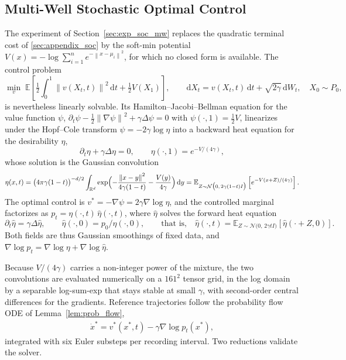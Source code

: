 \documentclass[preprint]{elsarticle}
\newcommand{\rd}{\mathrm{d}}
\newcommand{\dd}{\,\mathrm{d}}          %
\newcommand{\qb}[1]{\bigl(#1\bigr)}          %
\newcommand{\qB}[1]{\Bigl(#1\Bigr)}          %
\newcommand{\norm}[1]{\left\|#1\right\|}
\newcommand{\R}{\mathbb{R}}
\newcommand{\E}{\mathbb{E}}
\newcommand{\g}{\gamma}
\newcommand{\m}{\mu}
\newcommand{\sN}{\mathcal{N}}
\begin{document}
\subsection{Multi-Well Stochastic Optimal Control}\label{sec:appendix_soc_mw}

The experiment of Section~\ref{sec:exp_soc_mw} replaces the quadratic terminal cost of \ref{sec:appendix_soc} by the soft-min potential \(V(x)=-\log\sum_{i=1}^{n}e^{-\norm{x-\m_i}^2}\), for which no closed form is available. The control problem
\[
\min_v\;
\E\left[\tfrac12\int_0^1\norm{v(X_t,t)}^2\dd t+\tfrac12 V(X_1)\right],
\qquad
\rd X_t=v(X_t,t)\,\rd t+\sqrt{2\g}\,\rd W_t,
\quad X_0\sim P_0,
\]
is nevertheless linearly solvable. Its Hamilton--Jacobi--Bellman equation for the value function $\psi$, $\partial_t\psi-\tfrac12\norm{\nabla\psi}^2+\g\Delta\psi=0$ with $\psi(\cdot,1)=\tfrac12 V$, linearizes under the Hopf--Cole transform $\psi=-2\g\log\eta$ \cite{fleming2006controlled,kappen2005linear} into a backward heat equation for
the desirability $\eta$,
\[
\partial_t\eta+\g\Delta\eta=0,
\qquad
\eta(\cdot,1)=e^{-V/(4\g)},
\]
whose solution is the Gaussian convolution
\begin{align}
\eta(x,t)
=
\qb{4\pi\g(1-t)}^{-d/2}
\int_{\R^d}
\exp\qB{-\frac{\norm{x-y}^2}{4\g(1-t)}-\frac{V(y)}{4\g}}\dd y
=
\E_{Z\sim\sN\qb{0,\,2\g(1-t)I}}\left[e^{-V(x+Z)/(4\g)}\right].
\label{equ:hopfcole_eta}
\end{align}
The optimal control is $v^*=-\nabla\psi=2\g\nabla\log\eta$, and the controlled marginal factorizes as $p_t=\eta(\cdot,t)\,\hat\eta(\cdot,t)$, where $\hat\eta$ solves the forward heat equation~\cite{daipra1991stochastic,chen2021liaisons}
\[
\partial_t\hat\eta=\g\Delta\hat\eta,
\qquad
\hat\eta(\cdot,0)=p_0/\eta(\cdot,0),
\qquad\text{that is,}\quad
\hat\eta(\cdot,t)=\E_{Z\sim\sN\qb{0,\,2\g t I}}\left[\hat\eta(\cdot+Z,0)\right].
\]
Both fields are thus Gaussian smoothings of fixed data, and $\nabla\log p_t=\nabla\log\eta+\nabla\log\hat\eta$.

Because $V/(4\g)$ carries a non-integer power of the mixture, the two convolutions are evaluated numerically on a $161^2$ tensor grid, in the log domain by a separable log-sum-exp that stays stable at small $\g$, with second-order central differences for the gradients. Reference trajectories follow the probability flow ODE of Lemma~\ref{lem:prob_flow},
\begin{align}
\dot x^*=v^*(x^*,t)-\g\nabla\log p_t(x^*),
\label{equ:hopfcole_pfode}
\end{align}
integrated with six Euler substeps per recording interval. Two reductions validate the solver.
\end{document}
